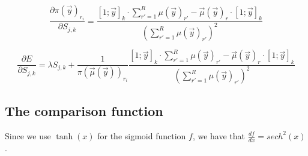 \documentclass[12pt,leqno,tbtags,twoside]{article}
\theoremstyle{dotless}
\begin{document}
\begin{equation}
\frac{\partial \pi(\vec{y})_{r_i}}{\partial S_{j,k}} = \frac{[1; \vec{y}]_{k}\cdot \sum_{r' = 1}^R \mu(\vec{y})_{r'} - \vec{\mu}(\vec{y})_r\cdot [1; \vec{y}]_{k}}{(\sum_{r' = 1}^R \mu(\vec{y})_{r'})^2}
\end{equation}


\begin{equation}
\frac{\partial E}{\partial S_{j,k}} = \lambda S_{j,k}  + \frac{ 1 }{\pi(\vec{\mu}(\vec{y}))_{r_i}} \frac{[1; \vec{y}]_{k}\cdot \sum_{r' = 1}^R \mu(\vec{y})_{r'} - \vec{\mu}(\vec{y})_r\cdot [1; \vec{y}]_{k}}{(\sum_{r' = 1}^R \mu(\vec{y})_{r'})^2}
\end{equation}







\subsection{The comparison function}

Since we use $\tanh(x)$ for the sigmoid function $f$, we have that $\frac{df}{dx} = sech^2(x)$.

{}

\end{document}
